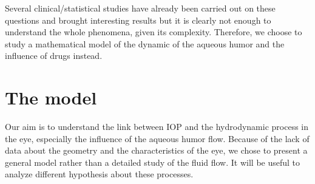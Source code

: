 \documentclass[english,12pt]{article}
\begin{document}
Several clinical/statistical studies have already been carried out on these questions and brought interesting results but it is clearly not enough to understand the whole phenomena, given its complexity. Therefore, we choose to study a mathematical model of the dynamic of the aqueous humor and the influence of drugs instead.
\section{The model}\label{s3}
Our aim is to understand the link between IOP and the hydrodynamic process in the eye, especially the influence of the aqueous humor flow.
Because of the lack of data about the geometry and the characteristics of the eye, we chose to present a general model rather than a detailed study of the fluid flow. It will be useful to analyze different hypothesis about these processes.
\end{document}
